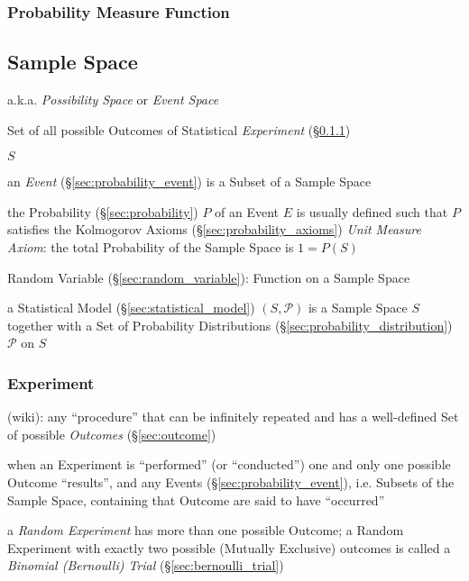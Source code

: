 \subsubsection{Probability Measure Function}
\label{sec:probability_measure_function}



\subsection{Sample Space}\label{sec:sample_space}

a.k.a. \emph{Possibility Space} or \emph{Event Space}

Set of all possible Outcomes of Statistical \emph{Experiment}
(\S\ref{sec:experiment})

$S$

an \emph{Event} (\S\ref{sec:probability_event}) is a Subset of a Sample Space

the Probability (\S\ref{sec:probability}) $P$ of an Event $E$ is usually defined
such that $P$ satisfies the Kolmogorov Axioms (\S\ref{sec:probability_axioms})
\fist \emph{Unit Measure Axiom}: the total Probability of the Sample Space is
$1 = P(S)$

Random Variable (\S\ref{sec:random_variable}): Function on a Sample Space

a Statistical Model (\S\ref{sec:statistical_model}) $(S,\mathcal{P})$ is a
Sample Space $S$ together with a Set of Probability Distributions
(\S\ref{sec:probability_distribution}) $\mathcal{P}$ on $S$



\subsubsection{Experiment}\label{sec:experiment}

(wiki): any ``procedure'' that can be infinitely repeated and has a well-defined
Set of possible \emph{Outcomes} (\S\ref{sec:outcome})

when an Experiment is ``performed'' (or ``conducted'') one and only one possible
Outcome ``results'', and any Events (\S\ref{sec:probability_event}), i.e.
Subsets of the Sample Space, containing that Outcome are said to have
``occurred''

a \emph{Random Experiment} has more than one possible Outcome; a Random
Experiment with exactly two possible (Mutually Exclusive) outcomes is called a
\emph{Binomial (Bernoulli) Trial} (\S\ref{sec:bernoulli_trial})

